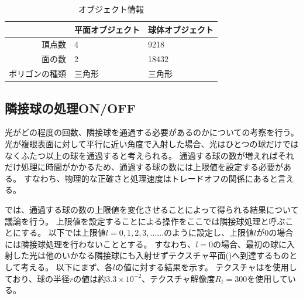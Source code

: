 \begin{table}[htbp]
\centering
\caption{オブジェクト情報 \label{TObjectInfo}}
\begin{tabular}{r||l|l|}
\hline
 & 平面オブジェクト & 球体オブジェクト \\ \hline
頂点数 & 4 & 9218 \\ \hline
面の数 & 2 & 18432 \\ \hline
ポリゴンの種類 & 三角形 & 三角形 \\ \hline
\end{tabular}
\end{table}

\subsection{隣接球の処理ON/OFF}%
\label{SSLimitNeighborSphere}

光がどの程度の回数、隣接球を通過する必要があるのかについての考察を行う。
光が複眼表面に対して平行に近い角度で入射した場合、光はひとつの球だけではなくふたつ以上の球を通過すると考えられる。
通過する球の数が増えればそれだけ処理に時間がかかるため、通過する球の数には上限値を設定する必要がある。
すなわち、物理的な正確さと処理速度はトレードオフの関係にあると言える。

では、通過する球の数の上限値を変化させることによって得られる結果について議論を行う。
上限値を設定することによる操作をここでは隣接球処理と呼ぶことにする。
以下では上限値$l = 0,1,2,3, ......$のように設定し、上限値$l$が$0$の場合には隣接球処理を行わないこととする。
すなわち、$l = 0$の場合、最初の球に入射した光は他のいかなる隣接球にも入射せずテクスチャ平面()へ到達するものとして考える。
以下にまず、各$l$の値に対する結果を示す。
テクスチャはを使用しており、球の半径$r$の値は約$3.3 \times 10^{-2}$、テクスチャ解像度$R_t = 300$を使用している。

